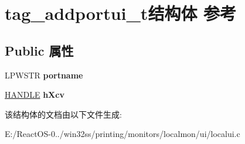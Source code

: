 \hypertarget{structtag__addportui__t}{}\section{tag\+\_\+addportui\+\_\+t结构体 参考}
\label{structtag__addportui__t}
\subsection*{Public 属性}
\begin{DoxyCompactItemize}
\item 
\mbox{\label{structtag__addportui__t_a381adbc88e89c1e5755f3a5589980dba}} 
L\+P\+W\+S\+TR {\bfseries portname}
\item 
\mbox{\label{structtag__addportui__t_a803c0886a957b50627419ae2b2094220}} 
\hyperlink{interfacevoid}{H\+A\+N\+D\+LE} {\bfseries h\+Xcv}
\end{DoxyCompactItemize}


该结构体的文档由以下文件生成\+:\begin{DoxyCompactItemize}
\item 
E\+:/\+React\+O\+S-\/0../win32ss/printing/monitors/localmon/ui/localui.\+c\end{DoxyCompactItemize}
